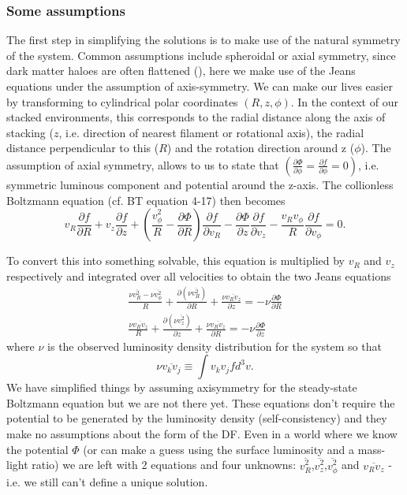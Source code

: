 \subsubsection{Some assumptions}
The first step in simplifying the solutions is to make use of the natural symmetry of the system. Common assumptions include spheroidal or axial symmetry, since dark matter haloes are often flattened (), here we make use of the Jeans equations under the assumption of axis-symmetry. We can make our lives easier by transforming to cylindrical polar coordinates $(R,z,\phi)$. In the context of our stacked environments, this corresponds to the radial distance along the axis of stacking ($z$, i.e. direction of nearest filament or rotational axis), the radial distance perpendicular to this ($R$) and the rotation direction around z ($\phi$). The assumption of axial symmetry, allows to us to state that $(\frac{\partial \Phi}{\partial \phi} = \frac{\partial f}{\partial \phi} = 0)$, i.e. symmetric luminous component and potential around the z-axis. The collionless Boltzmann equation (cf. BT equation 4-17) then becomes
\begin{equation}
v_{R}\frac{\partial f}{\partial R} + v_{z}\frac{\partial f}{\partial z} + \left(\frac{v_{\phi}^2}{R} - \frac{\partial \Phi}{\partial R}\right)\frac{\partial f}{\partial v_{R}} -\frac{\partial \Phi}{\partial z}\frac{\partial f}{\partial v_z} - \frac{v_R v_{\phi}}{R}\frac{\partial f}{\partial v_{\phi}} = 0.
\end{equation}

To convert this into something solvable, this equation is multiplied by $v_R$ and $v_z$ respectively and integrated over all velocities to obtain the two Jeans equations \citep[][; BT equation 4-29a,c]{jeans1922}
\begin{eqnarray} \label{basic_jeans1}
\frac{\nu \overline{v_{R}^{2}} - \nu \overline{v_{\phi}^{2}}}{R} + \frac{\partial (\nu \overline{v^{2}_{R}})}{\partial R} + \frac{\nu \overline{v_{R} v_{z}}}{\partial z} = - \nu \frac{\partial \Phi}{\partial R} \\
\frac{\nu \overline{v_{R}v_{z}}}{R} + \frac{\partial (\nu \overline{v^{2}_{z}})}{\partial z} + \frac{\nu \overline{v_{R} v_{z}}}{\partial R} = - \nu \frac{\partial \Phi}{\partial z} \label{basic_jeans2}
\end{eqnarray}
where $\nu$ is the observed luminosity density distribution for the system so that
\begin{equation}
\nu \overline{v_{k}v_{j}} \equiv \int v_{k} v_{j} f d^{3}v.
\end{equation}
We have simplified things by assuming axisymmetry for the steady-state Boltzmann equation but we are not there yet. These equations don't require the potential to be generated by the luminosity density (self-consistency) and they make no assumptions about the form of the DF. Even in a world where we know the potential $\Phi$ (or can make a guess using the surface luminosity and a mass-light ratio) we are left with 2 equations and four unknowns: $\overline{v_{R}^{2}}$,$\overline{v_{z}^{2}}$,$\overline{v_{\phi}^{2}}$ and $\overline{v_{R}v_{z}}$ - i.e. we still can't define a unique solution. 

